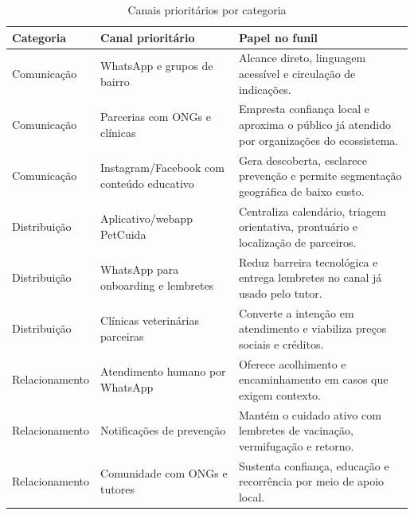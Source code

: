 \begin{table}[htbp]
\centering\small
\caption{Canais prioritários por categoria}
\label{tab:prioritarios}
\begin{tabularx}{\textwidth}{p{}p{}Y}
\toprule
\textbf{Categoria} & \textbf{Canal prioritário} & \textbf{Papel no funil}\\
\midrule
Comunicação & WhatsApp e grupos de bairro & Alcance direto, linguagem acessível e circulação de indicações.\\
Comunicação & Parcerias com ONGs e clínicas & Empresta confiança local e aproxima o público já atendido por organizações do ecossistema.\\
Comunicação & Instagram/Facebook com conteúdo educativo & Gera descoberta, esclarece prevenção e permite segmentação geográfica de baixo custo.\\
\addlinespace
Distribuição & Aplicativo/webapp PetCuida & Centraliza calendário, triagem orientativa, prontuário e localização de parceiros.\\
Distribuição & WhatsApp para onboarding e lembretes & Reduz barreira tecnológica e entrega lembretes no canal já usado pelo tutor.\\
Distribuição & Clínicas veterinárias parceiras & Converte a intenção em atendimento e viabiliza preços sociais e créditos.\\
\addlinespace
Relacionamento & Atendimento humano por WhatsApp & Oferece acolhimento e encaminhamento em casos que exigem contexto.\\
Relacionamento & Notificações de prevenção & Mantém o cuidado ativo com lembretes de vacinação, vermifugação e retorno.\\
Relacionamento & Comunidade com ONGs e tutores & Sustenta confiança, educação e recorrência por meio de apoio local.\\
\bottomrule
\end{tabularx}
\end{table}
